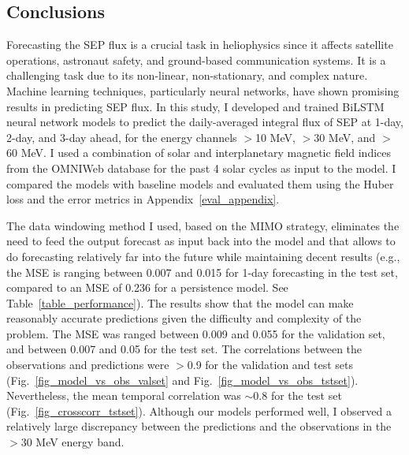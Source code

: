 \subsection{Conclusions}
Forecasting the SEP flux is a crucial task in heliophysics since it affects satellite operations, astronaut safety, and ground-based communication systems. It is a challenging task due to its non-linear, non-stationary, and complex nature. Machine learning techniques, particularly neural networks, have shown promising results in predicting SEP flux.
In this study, I developed and trained BiLSTM neural network models to predict the daily-averaged integral flux of SEP at 1-day, 2-day, and 3-day ahead, for the energy channels $>$10 MeV, $>$30 MeV, and $>$60 MeV.
I used a combination of solar and interplanetary magnetic field indices from the OMNIWeb database for the past 4 solar cycles as input to the model.
I compared the models with baseline models and evaluated them using the Huber loss and the error metrics in Appendix~\ref{eval_appendix}.

The data windowing method I used, based on the MIMO strategy, eliminates the need to feed the output forecast as input back into the model and that allows to do forecasting relatively far into the future while maintaining decent results (e.g., the MSE is ranging between 0.007 and 0.015 for 1-day forecasting in the test set, compared to an MSE of 0.236 for a persistence model. See Table~\ref{table_performance}).
The results show that the model can make reasonably accurate predictions given the difficulty and complexity of the problem.
The MSE was ranged between 0.009 and 0.055 for the validation set, and between 0.007 and 0.05 for the test set.
The correlations between the observations and predictions were $>$0.9 for the validation and test sets (Fig.~\ref{fig_model_vs_obs_valset} and Fig.~\ref{fig_model_vs_obs_tstset}).
Nevertheless, the mean temporal correlation was $\sim$0.8 for the test set (Fig.~\ref{fig_crosscorr_tstset}).
Although our models performed well, I observed a relatively large discrepancy between the predictions and the observations in the $>$30 MeV energy band.

